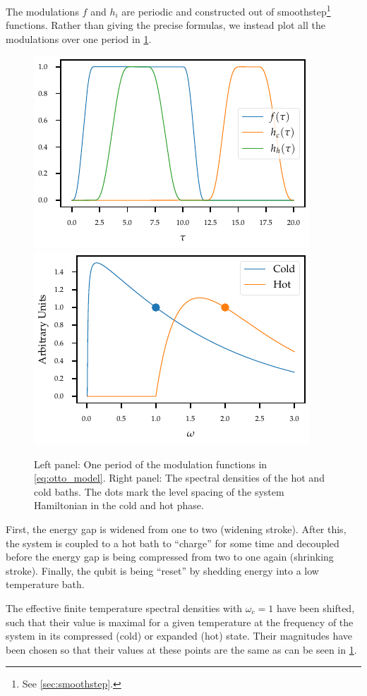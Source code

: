 The modulations \(f\) and \(h_{i}\) are periodic and constructed out
of smoothstep\footnote{See \cref{sec:smoothstep}.} functions. Rather
than giving the precise formulas, we instead plot all the modulations
over one period in \cref{fig:ottomod}.
\begin{figure}[ht]
  \centering
  \includegraphics{figs/otto/modulation}
  \includegraphics{figs/otto/spectral_densities}
  \caption{\label{fig:ottomod} Left panel: One period of the modulation functions
    in \cref{eq:otto_model}. Right panel: The spectral densities of
    the hot and cold baths. The dots mark the level spacing of the
    system Hamiltonian in the cold and hot phase.}
\end{figure}

First, the energy gap is widened from one to two (widening
stroke). After this, the system is coupled to a hot bath to ``charge''
for some time and decoupled before the energy gap is being compressed
from two to one again (shrinking stroke). Finally, the qubit is being
``reset'' by shedding energy into a low temperature bath.

The effective finite temperature spectral
densities with \(ω_{c}=1\) have been shifted, such that their value is
maximal for a given temperature at the frequency of the system in its
compressed (cold) or expanded (hot) state. Their magnitudes have been
chosen so that their values at these points are the same as can be
seen in \cref{fig:ottomod}.

